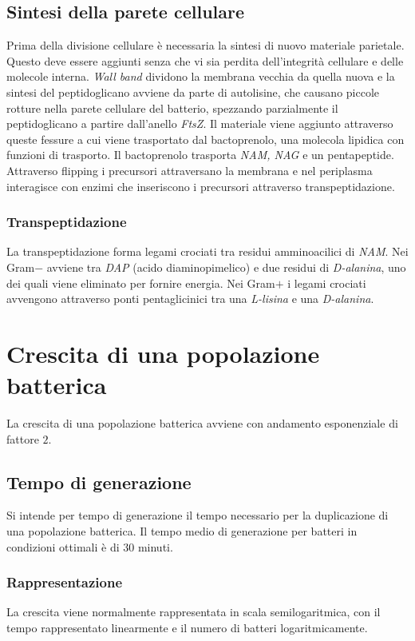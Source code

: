 	\subsection{Sintesi della parete cellulare}
	Prima della divisione cellulare \`e necessaria la sintesi di nuovo materiale parietale.
	Questo deve essere aggiunti senza che vi sia perdita dell'integrit\`a cellulare e delle molecole interna.
	\emph{Wall band} dividono la membrana vecchia da quella nuova e la sintesi del peptidoglicano avviene da parte di autolisine, che causano piccole rotture nella parete cellulare del batterio, spezzando parzialmente il peptidoglicano a partire dall'anello \emph{FtsZ}.
	Il materiale viene aggiunto attraverso queste fessure a cui viene trasportato dal bactoprenolo, una molecola lipidica con funzioni di trasporto.
	Il bactoprenolo trasporta \emph{NAM, NAG} e un pentapeptide.
	Attraverso flipping i precursori attraversano la membrana e nel periplasma interagisce con enzimi che inseriscono i precursori attraverso transpeptidazione.

		\subsubsection{Transpeptidazione}
		La transpeptidazione forma legami crociati tra residui amminoacilici di \emph{NAM}.
		Nei Gram$-$ avviene tra \emph{DAP} (acido diaminopimelico) e due residui di \emph{D-alanina},  uno dei quali viene eliminato per fornire energia.
		Nei Gram$+$ i legami crociati avvengono attraverso ponti pentaglicinici tra una \emph{L-lisina} e una \emph{D-alanina}.

\section{Crescita di una popolazione batterica}
La crescita di una popolazione batterica avviene con andamento esponenziale di fattore $2$.

	\subsection{Tempo di generazione}
	Si intende per tempo di generazione il tempo necessario per la duplicazione di una popolazione batterica.
	Il tempo medio di generazione per batteri in condizioni ottimali \`e di $30$ minuti.

		\subsubsection{Rappresentazione}
		La crescita viene normalmente rappresentata in scala semilogaritmica, con il tempo rappresentato linearmente e il numero di batteri logaritmicamente.

